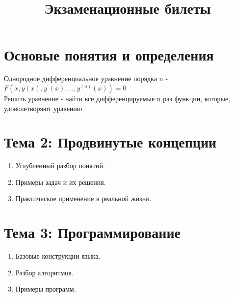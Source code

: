 
\usepackage{titlesec}



\title{Экзаменационные билеты}
\author{}
\date{}
\maketitle

\tableofcontents %
\newpage

\section{Основые понятия и определения}
	Однородное дифференциальное уравнение  порядка $n $ - $F\left(x,y(x), y^{'}(x),\dots, y^{(n)}(x)\right)=  0$\\
	Решить уравнение - найти  все дифференцируемые n раз функции, которые, удоволетворяют уравению 

\section{Тема 2: Продвинутые концепции}
\begin{enumerate}
    \item Углубленный разбор понятий.
    \item Примеры задач и их решения.
    \item Практическое применение в реальной жизни.
\end{enumerate}


\section{Тема 3: Программирование}
\begin{enumerate}
    \item Базовые конструкции языка.
    \item Разбор алгоритмов.
    \item Примеры программ.
\end{enumerate}



